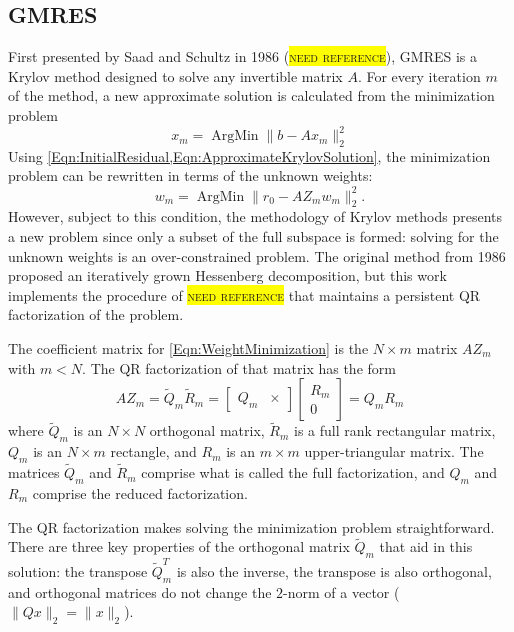 \documentclass[Prelim,12pt]{WisconsinThesis}
\newcommand{\NeedReference}{\colorbox{yellow}{\textsc{need reference}}}
\newcommand{\by}    {\!\times\!}
\DeclareMathOperator*{\ArgMin}{ArgMin}
\begin{document}
\subsection{GMRES}
First presented by Saad and Schultz in 1986 (\NeedReference{}), GMRES is a Krylov method designed to solve any invertible matrix $A$.
For every iteration $m$ of the method, a new approximate solution is calculated from the minimization problem
\begin{equation}
    x_m = \ArgMin\|b - A x_m\|_2^2
\end{equation}
Using \cref{Eqn:InitialResidual,Eqn:ApproximateKrylovSolution}, the minimization problem can be rewritten in terms of the unknown weights:
\begin{equation}
    w_m = \ArgMin\|r_0 - A Z_m w_m\|_2^2.
    \label{Eqn:WeightMinimization}
\end{equation}
However, subject to this condition, the methodology of Krylov methods presents a new problem since only a subset of the full subspace is formed: solving for the unknown weights is an over-constrained problem.
The original method from 1986 proposed an iteratively grown Hessenberg decomposition, but this work implements the procedure of \NeedReference{} that maintains a persistent QR factorization of the problem.

The coefficient matrix for \cref{Eqn:WeightMinimization} is the $N \by m$ matrix $A Z_m$  with $m < N$.
The QR factorization of that matrix has the form
\begin{equation}
    A Z_m
    =
    \widetilde{Q}_m \widetilde{R}_m 
    =
    \begin{bmatrix}
        Q_m & \times
    \end{bmatrix}
    \begin{bmatrix}
        R_m   \\
        0
    \end{bmatrix} = 
        Q_m R_m
\end{equation}
where $\widetilde{Q}_m$ is an $N \by N$ orthogonal matrix, $\widetilde{R}_m$ is a full rank  rectangular matrix, $Q_m$ is an $N \by m$ rectangle, and $R_m$ is an $m \by m$ upper-triangular matrix.
The matrices $\widetilde{Q}_m$ and $\widetilde{R}_m$ comprise what is called the full factorization, and $Q_m$ and $R_m$ comprise the reduced factorization.

The QR factorization makes solving the minimization problem straightforward.
There are three key properties of the orthogonal matrix $\widetilde{Q}_m$ that aid in this solution: the transpose $\widetilde{Q}^T_m$ is also the inverse, the transpose is also orthogonal, and orthogonal matrices do not change the $2$-norm of a vector ($\|Qx\|_2 = \|x\|_2 $).
\end{document}
